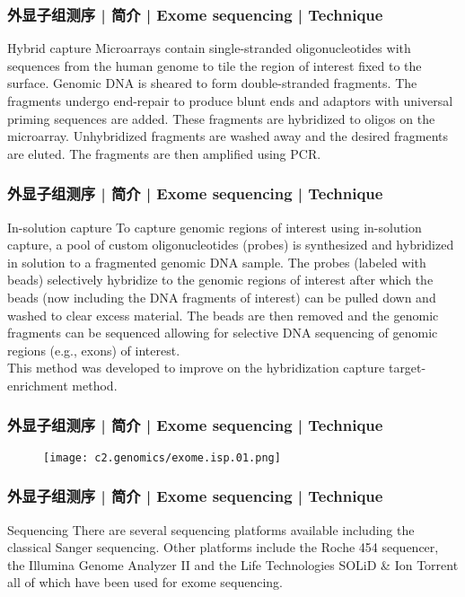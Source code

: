 \begin{frame}
  \frametitle{外显子组测序 | 简介 | Exome sequencing | Technique}
  \begin{block}{Hybrid capture}
    Microarrays contain single-stranded oligonucleotides with sequences from the human genome to tile the region of interest fixed to the surface. Genomic DNA is sheared to form double-stranded fragments. The fragments undergo end-repair to produce blunt ends and adaptors with universal priming sequences are added. These fragments are hybridized to oligos on the microarray. Unhybridized fragments are washed away and the desired fragments are eluted. The fragments are then amplified using PCR.
  \end{block}
\end{frame}

\begin{frame}
  \frametitle{外显子组测序 | 简介 | Exome sequencing | Technique}
  \begin{block}{In-solution capture}
 To capture genomic regions of interest using in-solution capture, a pool of custom oligonucleotides (probes) is synthesized and hybridized in solution to a fragmented genomic DNA sample. The probes (labeled with beads) selectively hybridize to the genomic regions of interest after which the beads (now including the DNA fragments of interest) can be pulled down and washed to clear excess material. The beads are then removed and the genomic fragments can be sequenced allowing for selective DNA sequencing of genomic regions (e.g., exons) of interest.\\
 \vspace{1em}
 This method was developed to improve on the hybridization capture target-enrichment method.
  \end{block}
\end{frame}

\begin{frame}
  \frametitle{外显子组测序 | 简介 | Exome sequencing | Technique}
  \begin{figure}
    \centering
    \texttt{[image: c2.genomics/exome.isp.01.png]}
  \end{figure}
\end{frame}

\begin{frame}
  \frametitle{外显子组测序 | 简介 | Exome sequencing | Technique}
  \begin{block}{Sequencing}
 There are several sequencing platforms available including the classical Sanger sequencing. Other platforms include the Roche 454 sequencer, the Illumina Genome Analyzer II and the Life Technologies SOLiD \& Ion Torrent all of which have been used for exome sequencing. 
  \end{block}
\end{frame}

